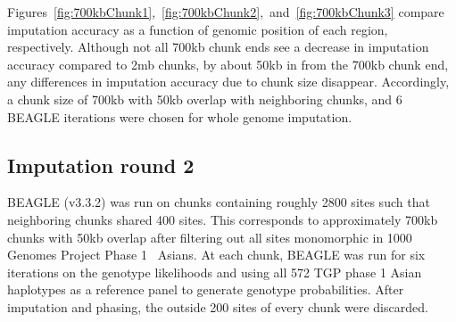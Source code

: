 \documentclass[nobib,a4paper]{tufte-handout}
\begin{document}
Figures~\ref{fig:700kbChunk1},~\ref{fig:700kbChunk2},~and~\ref{fig:700kbChunk3}
compare imputation accuracy as a function of genomic position of each
region, respectively. 
Although not all 700kb chunk ends see a decrease in imputation
accuracy compared to 2mb chunks, by about 50kb in from the 700kb chunk
end, any differences in imputation accuracy due to chunk size
disappear.
Accordingly, a chunk size of 700kb with 50kb overlap with neighboring
chunks, and 6 BEAGLE iterations were chosen for whole genome
imputation. 

\subsection{Imputation round 2}

BEAGLE (v3.3.2) was run on chunks containing roughly 2800 sites such
that neighboring chunks shared 400 sites. This corresponds to
approximately 700kb chunks with 50kb overlap after filtering out all
sites monomorphic in 1000 Genomes Project Phase
1~\autocite{Project2012} Asians. At each chunk, BEAGLE was run for six
iterations on the genotype likelihoods and using all 572 TGP phase 1
Asian haplotypes as a reference panel to generate genotype
probabilities.  
After imputation and phasing, the outside 200 sites of every chunk
were discarded.








\printbibliography
\end{document}
